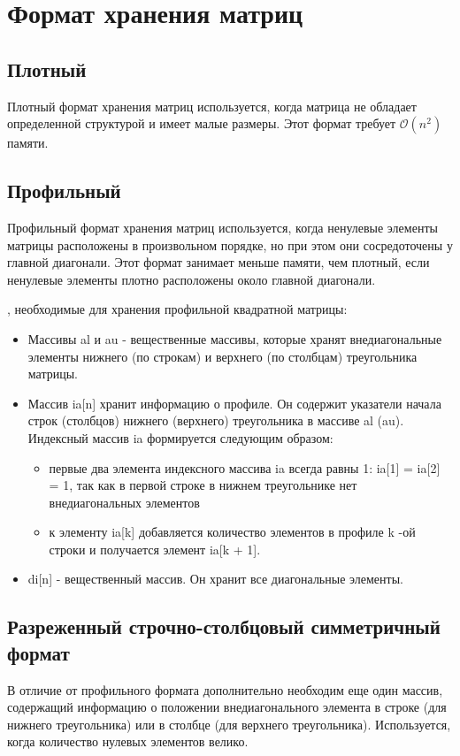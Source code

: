 \documentclass[a4paper,12pt]{article}
\begin{document}
\section{Формат хранения матриц}
\subsection{Плотный}
Плотный формат хранения матриц используется, когда матрица не обладает определенной структурой и имеет малые размеры. Этот формат требует $\mathcal{O}(n^2)$ памяти.

\subsection{Профильный}
Профильный формат хранения матриц используется, когда ненулевые элементы матрицы расположены в произвольном порядке, но при этом они сосредоточены у главной диагонали. 
Этот формат занимает меньше памяти, чем плотный, если ненулевые элементы плотно расположены около главной диагонали.

, необходимые для хранения профильной квадратной матрицы:
\begin{itemize}
    \item Массивы al и au - вещественные массивы, которые хранят внедиагональные элементы нижнего (по строкам) и верхнего (по столбцам) треугольника матрицы.
    \item Массив ia[n] хранит информацию о профиле. Он содержит указатели начала строк (столбцов) нижнего (верхнего) треугольника в массиве al (au). Индексный массив ia формируется следующим образом:
\begin{itemize}
    \item первые два элемента индексного массива ia всегда равны 1: ia[1] = ia[2] = 1, так как в первой строке в нижнем треугольнике нет внедиагональных элементов
    \item к элементу ia[k] добавляется количество элементов в профиле k -ой строки и получается элемент ia[k + 1].
\end{itemize}
    \item di[n] - вещественный массив. Он хранит все диагональные элементы.
\end{itemize}

\subsection{Разреженный строчно-столбцовый симметричный формат}
В отличие от профильного формата дополнительно необходим еще один массив, содержащий информацию о положении внедиагонального элемента в строке (для нижнего треугольника) или в столбце (для верхнего треугольника). Используется, когда количество нулевых элементов велико.
\end{document}
